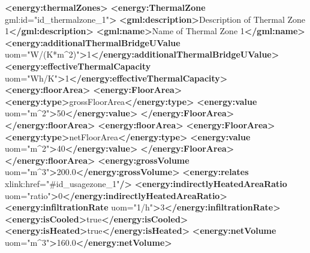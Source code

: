 \documentclass[a4paper,12pt]{article}
\newenvironment{Shaded}{}{}
\newcommand{\KeywordTok}[1]{\textcolor[rgb]{0.00,0.44,0.13}{\textbf{{#1}}}}
\newcommand{\StringTok}[1]{\textcolor[rgb]{0.25,0.44,0.63}{{#1}}}
\newcommand{\OtherTok}[1]{\textcolor[rgb]{0.00,0.44,0.13}{{#1}}}
\newcommand{\NormalTok}[1]{{#1}}
\begin{document}
\begin{Shaded}
\begin{Highlighting}[]
        \KeywordTok{<energy:thermalZones>}
            \KeywordTok{<energy:ThermalZone}\OtherTok{ gml:id=}\StringTok{"id_thermalzone_1"}\KeywordTok{>}
                \KeywordTok{<gml:description>}\NormalTok{Description of Thermal Zone 1}\KeywordTok{</gml:description>}
                \KeywordTok{<gml:name>}\NormalTok{Name of Thermal Zone 1}\KeywordTok{</gml:name>}
                \KeywordTok{<energy:additionalThermalBridgeUValue}\OtherTok{ uom=}\StringTok{"W/(K*m^2)"}\KeywordTok{>}\NormalTok{1}\KeywordTok{</energy:additionalThermalBridgeUValue>}
                \KeywordTok{<energy:effectiveThermalCapacity}\OtherTok{ uom=}\StringTok{"Wh/K"}\KeywordTok{>}\NormalTok{1}\KeywordTok{</energy:effectiveThermalCapacity>}
                \KeywordTok{<energy:floorArea>}
                    \KeywordTok{<energy:FloorArea>}
                        \KeywordTok{<energy:type>}\NormalTok{grossFloorArea}\KeywordTok{</energy:type>}
                        \KeywordTok{<energy:value}\OtherTok{ uom=}\StringTok{"m^2"}\KeywordTok{>}\NormalTok{50}\KeywordTok{</energy:value>}
                    \KeywordTok{</energy:FloorArea>}
                \KeywordTok{</energy:floorArea>}
                \KeywordTok{<energy:floorArea>}
                    \KeywordTok{<energy:FloorArea>}
                        \KeywordTok{<energy:type>}\NormalTok{netFloorArea}\KeywordTok{</energy:type>}
                        \KeywordTok{<energy:value}\OtherTok{ uom=}\StringTok{"m^2"}\KeywordTok{>}\NormalTok{40}\KeywordTok{</energy:value>}
                    \KeywordTok{</energy:FloorArea>}
                \KeywordTok{</energy:floorArea>}
                \KeywordTok{<energy:grossVolume}\OtherTok{ uom=}\StringTok{"m^3"}\KeywordTok{>}\NormalTok{200.0}\KeywordTok{</energy:grossVolume>}
                \KeywordTok{<energy:relates}\OtherTok{ xlink:href=}\StringTok{"#id_usagezone_1"}\KeywordTok{/>}
                \KeywordTok{<energy:indirectlyHeatedAreaRatio}\OtherTok{ uom=}\StringTok{"ratio"}\KeywordTok{>}\NormalTok{0}\KeywordTok{</energy:indirectlyHeatedAreaRatio>}
                \KeywordTok{<energy:infiltrationRate}\OtherTok{ uom=}\StringTok{"1/h"}\KeywordTok{>}\NormalTok{3}\KeywordTok{</energy:infiltrationRate>}
                \KeywordTok{<energy:isCooled>}\NormalTok{true}\KeywordTok{</energy:isCooled>}
                \KeywordTok{<energy:isHeated>}\NormalTok{true}\KeywordTok{</energy:isHeated>}
                \KeywordTok{<energy:netVolume}\OtherTok{ uom=}\StringTok{"m^3"}\KeywordTok{>}\NormalTok{160.0}\KeywordTok{</energy:netVolume>}
                

\end{Highlighting}
\end{Shaded}
\end{document}
